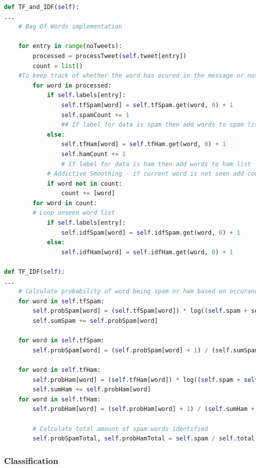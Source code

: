 \documentclass[oneside, 12pt]{article}
\begin{document}
		\begin{lstlisting}[language=python, caption=classifer class of spam\_filter.py]
def TF_and_IDF(self):
...
	# Bag Of Words implementation 
	
	for entry in range(noTweets):
		processed = processTweet(self.tweet[entry])
		count = list() 
	#To keep track of whether the word has ocured in the message or not. TF count
		for word in processed:
			if self.labels[entry]:
				self.tfSpam[word] = self.tfSpam.get(word, 0) + 1
				self.spamCount += 1	
				## If label for data is spam then add words to spam list
			else:
				self.tfHam[word] = self.tfHam.get(word, 0) + 1
				self.hamCount += 1
				# If label for data is ham then add words to ham list
			# Addictive Smoothing - if current word is not seen add count list
			if word not in count:
				count += [word]
		for word in count:
		# Loop unseen word list
			if self.labels[entry]:
				self.idfSpam[word] = self.idfSpam.get(word, 0) + 1
			else:
				self.idfHam[word] = self.idfHam.get(word, 0) + 1

def TF_IDF(self):
...
	# Calculate probability of word being spam or ham based on occurance in text compared to counted sets along with relevant keys
	for word in self.tfSpam:
		self.probSpam[word] = (self.tfSpam[word]) * log((self.spam + self.ham) / (self.idfSpam[word] + self.idfHam.get(word, 0)))
		self.sumSpam += self.probSpam[word]
	
	for word in self.tfSpam:
		self.probSpam[word] = (self.probSpam[word] + 1) / (self.sumSpam + len(list(self.probSpam.keys())))
	
	for word in self.tfHam:
		self.probHam[word] = (self.tfHam[word]) * log((self.spam + self.ham) / (self.idfSpam.get(word, 0) + self.idfHam[word]))
		self.sumHam += self.probHam[word]
	for word in self.tfHam:
		self.probHam[word] = (self.probHam[word] + 1) / (self.sumHam + len(list(self.probHam.keys())))
		
		# Calculate total amount of spam words identified
		self.probSpamTotal, self.probHamTotal = self.spam / self.total, self.ham / self.total
		\end{lstlisting}
		
		\subsubsection{Classification}
		
\end{document}
